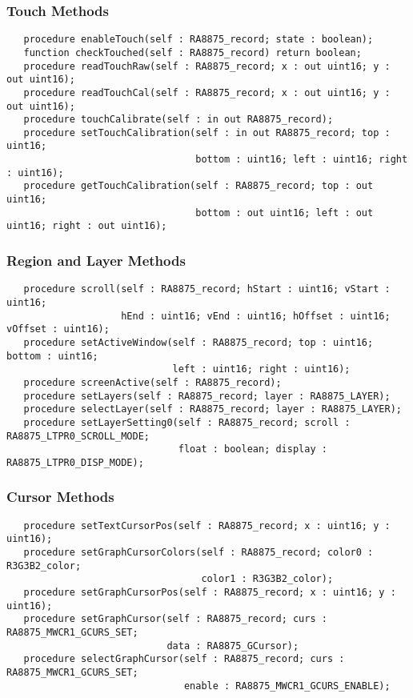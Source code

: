 \documentclass[10pt, openany]{book}
\begin{document}
\subsubsection{Touch Methods}
\begin{lstlisting}
   procedure enableTouch(self : RA8875_record; state : boolean);
   function checkTouched(self : RA8875_record) return boolean;
   procedure readTouchRaw(self : RA8875_record; x : out uint16; y : out uint16);
   procedure readTouchCal(self : RA8875_record; x : out uint16; y : out uint16);
   procedure touchCalibrate(self : in out RA8875_record);
   procedure setTouchCalibration(self : in out RA8875_record; top : uint16;
                                 bottom : uint16; left : uint16; right : uint16);
   procedure getTouchCalibration(self : RA8875_record; top : out uint16;
                                 bottom : out uint16; left : out uint16; right : out uint16);
\end{lstlisting}

\subsubsection{Region and Layer Methods}
\begin{lstlisting}
   procedure scroll(self : RA8875_record; hStart : uint16; vStart : uint16;
                    hEnd : uint16; vEnd : uint16; hOffset : uint16; vOffset : uint16);
   procedure setActiveWindow(self : RA8875_record; top : uint16; bottom : uint16;
                             left : uint16; right : uint16);
   procedure screenActive(self : RA8875_record);
   procedure setLayers(self : RA8875_record; layer : RA8875_LAYER);
   procedure selectLayer(self : RA8875_record; layer : RA8875_LAYER);
   procedure setLayerSetting0(self : RA8875_record; scroll : RA8875_LTPR0_SCROLL_MODE;
                              float : boolean; display : RA8875_LTPR0_DISP_MODE);
\end{lstlisting}

\subsubsection{Cursor Methods}
\begin{lstlisting}
   procedure setTextCursorPos(self : RA8875_record; x : uint16; y : uint16);
   procedure setGraphCursorColors(self : RA8875_record; color0 : R3G3B2_color;
                                  color1 : R3G3B2_color);
   procedure setGraphCursorPos(self : RA8875_record; x : uint16; y : uint16);
   procedure setGraphCursor(self : RA8875_record; curs : RA8875_MWCR1_GCURS_SET;
                            data : RA8875_GCursor);
   procedure selectGraphCursor(self : RA8875_record; curs : RA8875_MWCR1_GCURS_SET;
                               enable : RA8875_MWCR1_GCURS_ENABLE);
\end{lstlisting}
\end{document}
